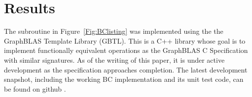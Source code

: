 \section{Results}
\label{sec:results}

The subroutine in Figure~\ref{Fig:BClisting} was implemented using the
the GraphBLAS Template Library (GBTL)\cite{gbtl-cuda16}. This is a C++ library whose
goal is to implement functionally equivalent operations as the GraphBLAS C
Specification with similar signatures.  As of the writing of this paper, it is 
under active development as the specification approaches 
completion.  The latest development snapshot, including the working BC 
implementation and its unit test code, can be found on github \cite{gbtl-github}.  

